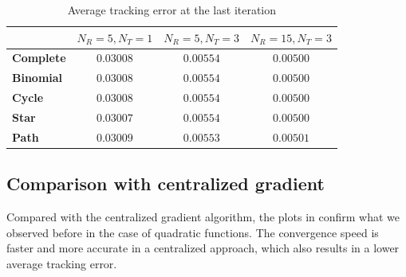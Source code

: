\documentclass[a4paper,11pt,oneside]{book}
\begin{document}
\begin{table}[ht]
      \centering
      \small
      \caption{Average tracking error at the last iteration}
      \label{tab:tracking_error}
      \begin{tabular}{lccc}
            \toprule
            & $N_R=5, N_T=1$ & $N_R=5, N_T=3$ & $N_R=15, N_T=3$ \\
            \midrule
            \textbf{Complete} & $0.03008$ & $0.00554$ & $0.00500$ \\
            \textbf{Binomial} & $0.03008$ & $0.00554$ & $0.00500$ \\
            \textbf{Cycle}    & $0.03008$ & $0.00554$ & $0.00500$ \\
            \textbf{Star}     & $0.03007$ & $0.00554$ & $0.00500$ \\
            \textbf{Path}     & $0.03009$ & $0.00553$ & $0.00501$ \\
            \bottomrule
      \end{tabular}
\end{table}


\subsection{Comparison with centralized gradient}

Compared with the centralized gradient algorithm, the plots in  confirm what we observed before in the case of quadratic functions. The convergence speed is faster and more accurate in a centralized approach, which also results in a lower average tracking error.
\end{document}
